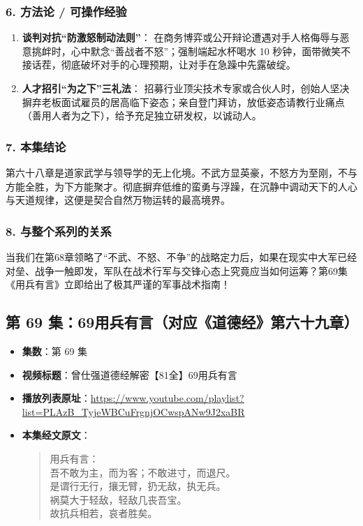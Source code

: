 \subsubsection{6. 方法论 / 可操作经验}
\begin{enumerate}
    \item \textbf{谈判对抗“防激怒制动法则”}：
    在商务博弈或公开辩论遭遇对手人格侮辱与恶意挑衅时，心中默念“善战者不怒”；强制端起水杯喝水 10 秒钟，面带微笑不接话茬，彻底破坏对手的心理预期，让对手在急躁中先露破绽。
    \item \textbf{人才招引“为之下”三礼法}：
    招募行业顶尖技术专家或合伙人时，创始人坚决摒弃老板面试雇员的居高临下姿态；亲自登门拜访，放低姿态请教行业痛点（善用人者为之下），给予充足独立研发权，以诚动人。
\end{enumerate}

\subsubsection{7. 本集结论}
第六十八章是道家武学与领导学的无上化境。不武方显英豪，不怒方为至刚，不与方能全胜，为下方能聚才。彻底摒弃低维的蛮勇与浮躁，在沉静中调动天下的人心与天道规律，这便是契合自然万物运转的最高境界。

\subsubsection{8. 与整个系列的关系}
当我们在第68章领略了“不武、不怒、不争”的战略定力后，如果在现实中大军已经对垒、战争一触即发，军队在战术行军与交锋心态上究竟应当如何运筹？第69集《用兵有言》立即给出了极其严谨的军事战术指南！

\clearpage

\subsection{第 69 集：69用兵有言（对应《道德经》第六十九章）}
\label{sec:ep69}

\begin{itemize}
    \item \textbf{集数}：第 69 集
    \item \textbf{视频标题}：曾仕强道德经解密【81全】69用兵有言
    \item \textbf{播放列表原址}：\url{https://www.youtube.com/playlist?list=PLAzB_TyjeWBCuFrgnjOCwspANw9J2xaBR}
    \item \textbf{本集经文原文}：
    \begin{quote}\kaishu
    用兵有言：\\
    吾不敢为主，而为客；不敢进寸，而退尺。\\
    是谓行无行，攘无臂，扔无敌，执无兵。\\
    祸莫大于轻敌，轻敌几丧吾宝。\\
    故抗兵相若，哀者胜矣。
    \end{quote}
\end{itemize}

